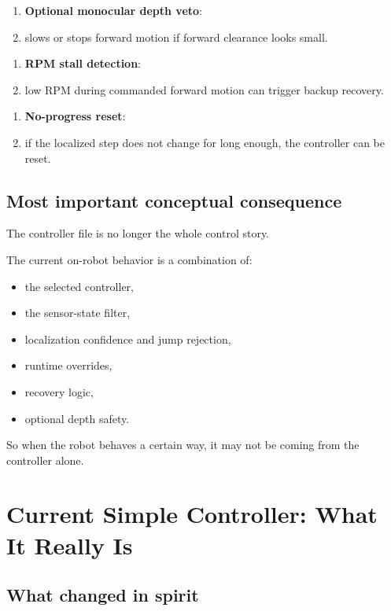 \documentclass[11pt,a4paper]{article}
\begin{document}
\begin{enumerate}
  \item \textbf{Optional monocular depth veto}:
  \item slows or stops forward motion if forward clearance looks small.
\end{enumerate}

\begin{enumerate}
  \item \textbf{RPM stall detection}:
  \item low RPM during commanded forward motion can trigger backup recovery.
\end{enumerate}

\begin{enumerate}
  \item \textbf{No-progress reset}:
  \item if the localized step does not change for long enough, the controller can be reset.
\end{enumerate}

\subsection{Most important conceptual consequence}

The controller file is no longer the whole control story.

The current on-robot behavior is a combination of:

\begin{itemize}[nosep]
  \item the selected controller,
  \item the sensor-state filter,
  \item localization confidence and jump rejection,
  \item runtime overrides,
  \item recovery logic,
  \item optional depth safety.
\end{itemize}

So when the robot behaves a certain way, it may not be coming from the
controller alone.


\section{Current Simple Controller: What It Really Is}

\subsection{What changed in spirit}
\end{document}
